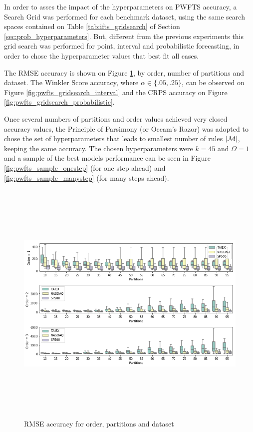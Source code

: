 In order to asses the impact of the hyperparameters on PWFTS accuracy, a Search Grid was performed for each benchmark dataset, using the same search spaces contained on Table \ref{tab:ifts_gridsearch} of Section \ref{sec:prob_hyperparameters}. But, different from the previous experiments this grid search was performed for point, interval and probabilistic forecasting, in order to chose the hyperparameter values that best fit all cases.

The RMSE accuracy is shown on Figure \ref{fig:pwfts_gridsearch_point}, by order, number of partitions and dataset. The Winkler Score accuracy, where  $\alpha \in \{.05,.25\}$, can be observed on Figure \ref{fig:pwfts_gridsearch_interval} and the CRPS accuracy on Figure \ref{fig:pwfts_gridsearch_probabilistic}.

Once several numbers of partitions and order values achieved very closed accuracy values, the Principle of Parsimony (or Occam's Razor) was adopted to chose the set of hyperparameters that leads to smallest number of rules $|\mathcal{M}|$, keeping the same accuracy. The chosen hyperparameters were $k = 45$ and $\Omega = 1$ and a sample of the best models performance can be seen in Figure \ref{fig:pwfts_sample_onestep} (for one step ahead) and \ref{fig:pwfts_sample_manystep} (for many steps ahead).


\begin{figure}[htb]
    \centering
    \includegraphics[width=\textwidth,height=12cm]{figures/pwfts_gridsearch_point.png}
    \caption{RMSE accuracy for order, partitions and dataset}
    \label{fig:pwfts_gridsearch_point}
\end{figure}

